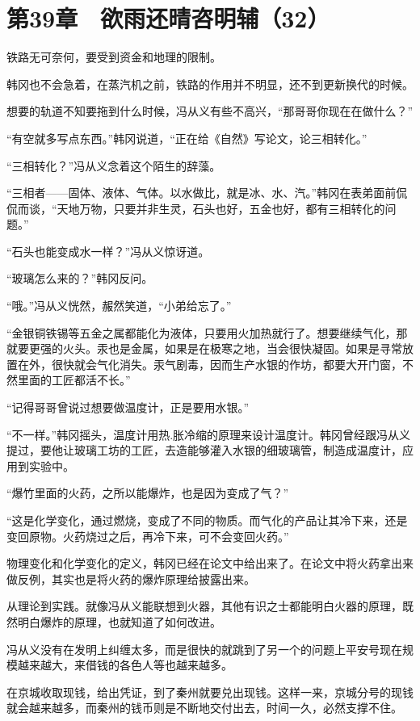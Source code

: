 \section{第39章　欲雨还晴咨明辅（32）}

铁路无可奈何，要受到资金和地理的限制。

韩冈也不会急着，在蒸汽机之前，铁路的作用并不明显，还不到更新换代的时候。

想要的轨道不知要拖到什么时候，冯从义有些不高兴，“那哥哥你现在在做什么？”

“有空就多写点东西。”韩冈说道，“正在给《自然》写论文，论三相转化。”

“三相转化？”冯从义念着这个陌生的辞藻。

“三相者——固体、液体、气体。以水做比，就是冰、水、汽。”韩冈在表弟面前侃侃而谈，“天地万物，只要并非生灵，石头也好，五金也好，都有三相转化的问题。”

“石头也能变成水一样？”冯从义惊讶道。

“玻璃怎么来的？”韩冈反问。

“哦。”冯从义恍然，赧然笑道，“小弟给忘了。”

“金银铜铁锡等五金之属都能化为液体，只要用火加热就行了。想要继续气化，那就要更强的火头。汞也是金属，如果是在极寒之地，当会很快凝固。如果是寻常放置在外，很快就会气化消失。汞气剧毒，因而生产水银的作坊，都要大开门窗，不然里面的工匠都活不长。”

“记得哥哥曾说过想要做温度计，正是要用水银。”

“不一样。”韩冈摇头，温度计用热.胀冷缩的原理来设计温度计。韩冈曾经跟冯从义提过，要他让玻璃工坊的工匠，去造能够灌入水银的细玻璃管，制造成温度计，应用到实验中。

“爆竹里面的火药，之所以能爆炸，也是因为变成了气？”

“这是化学变化，通过燃烧，变成了不同的物质。而气化的产品让其冷下来，还是变回原物。火药烧过之后，再冷下来，可不会变回火药。”

物理变化和化学变化的定义，韩冈已经在论文中给出来了。在论文中将火药拿出来做反例，其实也是将火药的爆炸原理给披露出来。

从理论到实践。就像冯从义能联想到火器，其他有识之士都能明白火器的原理，既然明白爆炸的原理，也就知道了如何改进。

冯从义没有在发明上纠缠太多，而是很快的就跳到了另一个的问题上平安号现在规模越来越大，来借钱的各色人等也越来越多。

在京城收取现钱，给出凭证，到了秦州就要兑出现钱。这样一来，京城分号的现钱就会越来越多，而秦州的钱币则是不断地交付出去，时间一久，必然支撑不住。

